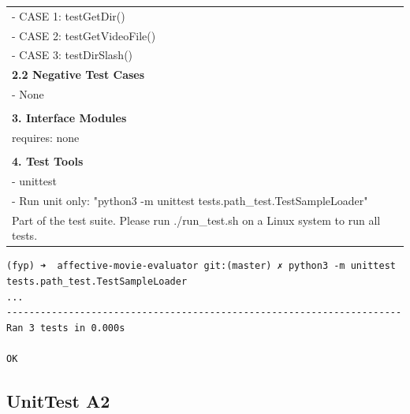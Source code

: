 \documentclass[12pt,a4paper,man]{report}
\begin{document}
\begin{longtable}{|p{7in}|}
\hline
- CASE 1: testGetDir()\\
- CASE 2: testGetVideoFile()\\
- CASE 3: testDirSlash()\\
\hline
\textbf{2.2 Negative Test Cases}\\
\hline
- None\\
\\
\hline
\textbf{3. Interface Modules}\\
\hline
requires: none\\
\\
\hline
\textbf{4. Test Tools}\\
\hline
- unittest\\
- Run unit only: "python3 -m unittest tests.path\_test.TestSampleLoader"\\
Part of the test suite. Please run ./run\_test.sh on a Linux system to run all tests.\\
\hline
\end{longtable}

\begin{verbatim}
(fyp) ➜  affective-movie-evaluator git:(master) ✗ python3 -m unittest tests.path_test.TestSampleLoader
...
----------------------------------------------------------------------
Ran 3 tests in 0.000s

OK
\end{verbatim}

\subsection{UnitTest A2}
\label{sec:org5b6a8a5}
\end{document}
